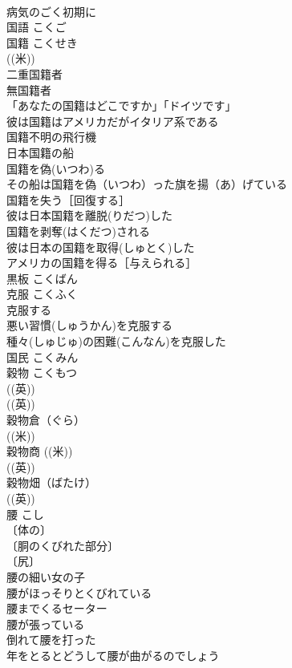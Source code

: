 \documentclass[8pt]{extreport}
\begin{document}
\begin{CJK}{UTF8}{min}
\\	病気のごく初期に 
\\	国語	こくご	
\\	国籍	こくせき	
\\	((米))
\\	二重国籍者 
\\	無国籍者 
\\	「あなたの国籍はどこですか」「ドイツです」 
\\	彼は国籍はアメリカだがイタリア系である 
\\	国籍不明の飛行機 
\\	日本国籍の船 
\\	国籍を偽(いつわ)る 
\\	その船は国籍を偽（いつわ）った旗を揚（あ）げている 
\\	国籍を失う［回復する］ 
\\	彼は日本国籍を離脱(りだつ)した 
\\	国籍を剥奪(はくだつ)される 
\\	彼は日本の国籍を取得(しゅとく)した 
\\	アメリカの国籍を得る［与えられる］ 
\\	黒板	こくばん	
\\	克服	こくふく	
\\	克服する 
\\	悪い習慣(しゅうかん)を克服する 
\\	種々(しゅじゅ)の困難(こんなん)を克服した 
\\	国民	こくみん	
\\	穀物	こくもつ	
\\	((英)) 
\\	((英)) 
\\	穀物倉（ぐら） 
\\	((米)) 
\\	穀物商 ((米)) 
\\	((英)) 
\\	穀物畑（ばたけ） 
\\	((英)) 
\\	腰	こし	
\\	〔体の〕
\\	〔胴のくびれた部分〕
\\	〔尻〕
\\	腰の細い女の子 
\\	腰がほっそりとくびれている 
\\	腰までくるセーター 
\\	腰が張っている 
\\	倒れて腰を打った 
\\	年をとるとどうして腰が曲がるのでしょう 

\end{CJK}
\end{document}
